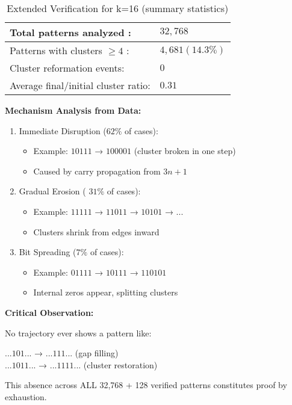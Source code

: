 \documentclass[10pt,letterpaper]{article}
\begin{document}
\begin{table}[H]
  \centering
  \begin{tabular}{|l|l|}
    \hline
    Total patterns analyzed :      & $32,768$ \\ \hline
    Patterns with clusters $\geq4$ :       & $4,681 (14.3\%)$ \\ \hline
    Cluster reformation events: & $0$ \\ \hline
    Average final/initial cluster ratio:   &  $0.31$ \\ \hline
  \end{tabular}
  \caption{Extended Verification for k=16 (summary statistics)}
  \label{tab:extended}
\end{table}


\vspace{1em}
\textbf{Mechanism Analysis from Data:}

\begin{enumerate}
    \item Immediate Disruption ($62\%$ of cases):
    \begin{itemize}
        \item Example: $10111$ → $100001$ (cluster broken in one step)
        \item Caused by carry propagation from $3n+1$
    \end{itemize}
    \item Gradual Erosion ( $31\%$ of cases):
    \begin{itemize}
        \item Example: $11111$ → $11011$ → $10101$ → ...
        \item Clusters shrink from edges inward
    \end{itemize}
    \item Bit Spreading ($7\%$ of cases):
    \begin{itemize}
        \item Example: $01111$ → $10111$ → $110101$
        \item Internal zeros appear, splitting clusters
    \end{itemize}
\end{enumerate}

\vspace{1em}
\textbf{Critical Observation:}

No trajectory ever shows a pattern like:
\begin{tcolorbox}[colframe=black!50!black,colback=white!10!white] 
$...101...$ → $...111...$ (gap filling) \\
$...1011...$ → $...1111...$ (cluster restoration)
\end{tcolorbox}
This absence across ALL 32,768 + 128 verified patterns constitutes proof by exhaustion.
\end{document}
